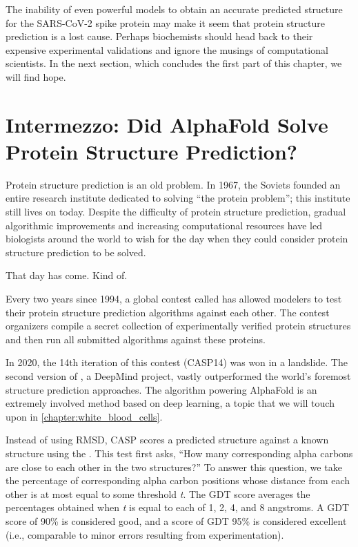 The inability of even powerful models to obtain an accurate predicted structure for the SARS-CoV-2 spike protein may make it seem that protein structure prediction is a lost cause. Perhaps biochemists should head back to their expensive experimental validations and ignore the musings of computational scientists. In the next section, which concludes the first part of this chapter, we will find hope.\\


\section{Intermezzo: Did AlphaFold Solve Protein Structure Prediction?}
\label{sec:intermezzo}

Protein structure prediction is an old problem. In 1967, the Soviets founded an entire research institute dedicated to solving ``the protein problem''; this institute still lives on today. Despite the difficulty of protein structure prediction, gradual algorithmic improvements and increasing computational resources have led biologists around the world to wish for the day when they could consider protein structure prediction to be solved.

That day has come. Kind of.

Every two years since 1994, a global contest called  has allowed modelers to test their protein structure prediction algorithms against each other. The contest organizers compile a secret collection of experimentally verified protein structures and then run all submitted algorithms against these proteins.

In 2020, the 14th iteration of this contest (CASP14) was won in a landslide. The second version of \href{https://bit.ly/3sKl6pH}{}, a DeepMind project, vastly outperformed the world's foremost structure prediction approaches. The algorithm powering AlphaFold is an extremely involved method based on deep learning, a topic that we will touch upon in \autoref{chapter:white_blood_cells}.

Instead of using RMSD, CASP scores a predicted structure against a known structure using the . This test first asks, ``How many corresponding alpha carbons are close to each other in the two structures?'' To answer this question, we take the percentage of corresponding alpha carbon positions whose distance from each other is at most equal to some threshold \textit{t}. The GDT score averages the percentages obtained when \textit{t} is equal to each of 1, 2, 4, and 8 angstroms. A GDT score of 90\% is considered good, and a score of GDT 95\% is considered excellent (i.e., comparable to minor errors resulting from experimentation).

